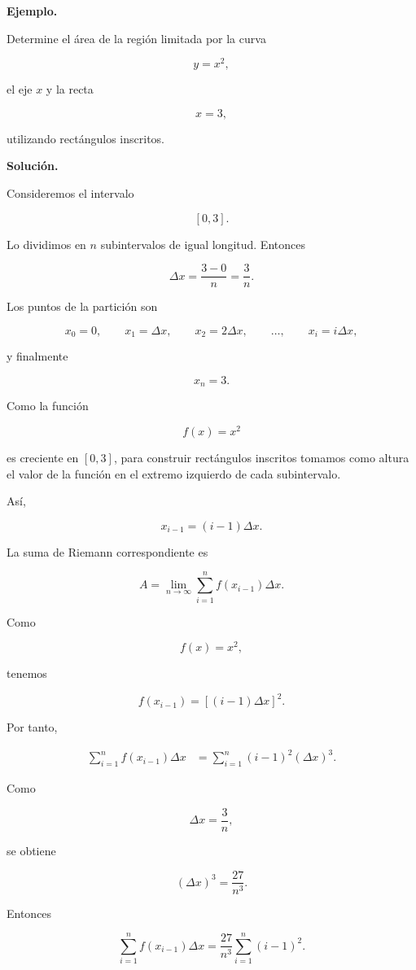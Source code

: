 \documentclass[12pt]{article}
\newenvironment{Ejem}
{\par\medskip\noindent\textbf{Ejemplo.}\ }
{\par\medskip}
\begin{document}
\begin{Ejem}

Determine el área de la región limitada por la curva

\[
y=x^2,
\]

el eje $x$ y la recta

\[
x=3,
\]

utilizando rectángulos inscritos.

\textbf{Solución.}

Consideremos el intervalo

\[
[0,3].
\]

Lo dividimos en $n$ subintervalos de igual longitud. Entonces

\[
\Delta x
=
\frac{3-0}{n}
=
\frac{3}{n}.
\]

Los puntos de la partición son

\[
x_0=0,\qquad
x_1=\Delta x,\qquad
x_2=2\Delta x,\qquad
\ldots,\qquad
x_i=i\Delta x,
\]

y finalmente

\[
x_n=3.
\]

Como la función

\[
f(x)=x^2
\]

es creciente en $[0,3]$, para construir rectángulos inscritos tomamos
como altura el valor de la función en el extremo izquierdo de cada
subintervalo.

Así,

\[
x_{i-1}=(i-1)\Delta x.
\]

La suma de Riemann correspondiente es

\[
A
=
\lim_{n\to\infty}
\sum_{i=1}^{n}
f(x_{i-1})\Delta x.
\]

Como

\[
f(x)=x^2,
\]

tenemos

\[
f(x_{i-1})
=
\left[(i-1)\Delta x\right]^2.
\]

Por tanto,

\begin{align*}
\sum_{i=1}^{n}
f(x_{i-1})\Delta x
&=
\sum_{i=1}^{n}
(i-1)^2(\Delta x)^3.
\end{align*}

Como

\[
\Delta x=\frac{3}{n},
\]

se obtiene

\[
(\Delta x)^3
=
\frac{27}{n^3}.
\]

Entonces

\[
\sum_{i=1}^{n}
f(x_{i-1})\Delta x
=
\frac{27}{n^3}
\sum_{i=1}^{n}(i-1)^2.
\]


\end{Ejem}
\end{document}
